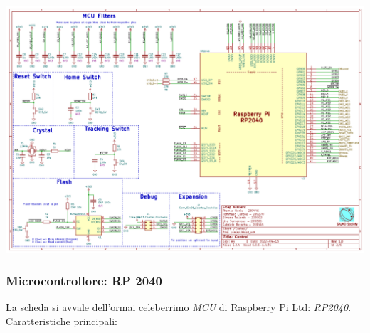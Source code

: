 \begin{center}
\includegraphics[scale=0.5]{figures/image40.png}
\captionsetup{type=figure}
\end{center}

\hypertarget{microcontrollore-rp-2040}{%
\subsubsection{\texorpdfstring{\hfill\break
Microcontrollore: RP
2040}{ Microcontrollore: RP 2040}}\label{microcontrollore-rp-2040}}

La scheda si avvale dell'ormai celeberrimo \emph{MCU} di Raspberry Pi Ltd: \emph{RP2040}.\\
Caratteristiche principali:

